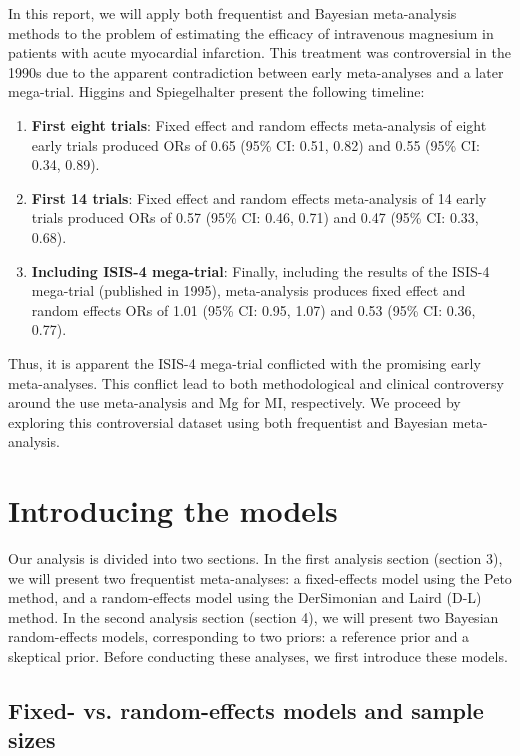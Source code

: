 \documentclass[fleqn,10pt]{SelfArx} %
\begin{document}
In this report, we will apply both frequentist and Bayesian meta-analysis methods to the problem of estimating the efficacy of intravenous magnesium in patients with acute myocardial infarction. This treatment was controversial in the 1990s due to the apparent contradiction between early meta-analyses and a later mega-trial. Higgins and Spiegelhalter \cite{Original} present the following timeline:
\begin{enumerate}
\item \textbf{First eight trials}: Fixed effect and random effects meta-analysis of eight early trials produced ORs of 0.65 (95\% CI: 0.51, 0.82) and 0.55 (95\% CI: 0.34, 0.89).
\item \textbf{First 14 trials}: Fixed effect and random effects meta-analysis of 14 early trials produced ORs of 0.57 (95\% CI: 0.46, 0.71) and 0.47 (95\% CI: 0.33, 0.68).
\item \textbf{Including ISIS-4 mega-trial}: Finally, including the results of the ISIS-4 mega-trial (published in 1995), meta-analysis produces fixed effect and random effects ORs of 1.01 (95\% CI: 0.95, 1.07) and 0.53 (95\% CI: 0.36, 0.77).
\end{enumerate}
Thus, it is apparent the ISIS-4 mega-trial conflicted with the promising early meta-analyses. This conflict lead to both methodological and clinical controversy around the use meta-analysis and Mg for MI, respectively. We proceed by exploring this controversial dataset using both frequentist and Bayesian meta-analysis. 

\section{Introducing the models}

Our analysis is divided into two sections. In the first analysis section (section 3), we will present two frequentist meta-analyses: a fixed-effects model using the Peto method, and a random-effects model using the DerSimonian and Laird (D-L) method. In the second analysis section (section 4), we will present two Bayesian random-effects models, corresponding to two priors: a reference prior and a skeptical prior. Before conducting these analyses, we first introduce these models.

\subsection*{Fixed- vs. random-effects models and sample sizes}
\end{document}
